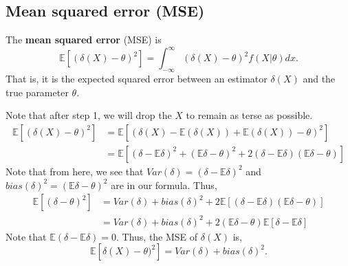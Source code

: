 \documentclass[titlepage, 12pt, leqno]{article}
\begin{document}
\subsection{Mean squared error (MSE)}
\begin{definition}
    The \textbf{mean squared error} (MSE) is
    \[
        \mathbb{E}[(\delta(X) - \theta)^{2}] = \int_{-\infty}^{\infty}
        (\delta(X) - \theta)^{2}f(X|\theta)dx.
    \]
    That is, it is the expected squared error between an estimator $\delta(X)$ 
    and the true parameter $\theta$.
\end{definition}
Note that after step 1, we will drop the $X$ to remain as terse as possible.
\begin{align*}
    \mathbb{E}[(\delta(X) - \theta)^{2}] &= \mathbb{E}[(\delta(X) - 
    \mathbb{E}(\delta(X)) + \mathbb{E}(\delta(X)) - \theta)^{2}] \\
                         &= \mathbb{E}[(\delta - \mathbb{E}\delta)^{2} + 
                         (\mathbb{E}\delta - \theta)^{2} + 2(\delta - 
                         \mathbb{E}\delta)(\mathbb{E}\delta-\theta)]
\end{align*}
Note that from here, we see that $Var(\delta) = (\delta - \mathbb{E}\delta)^{2}$
and $bias(\delta)^{2} = (\mathbb{E}\delta - \theta)^{2}$ are in our formula.
Thus,
\begin{align*}
    \mathbb{E}[(\delta - \theta)^{2}] &= Var(\delta) + bias(\delta)^{2} + 
    2\mathbb{E}[(\delta - \mathbb{E}\delta)(\mathbb{E}\delta-\theta)] \\
                                      &= Var(\delta) + bias(\delta)^{2} + 
                                      2(\mathbb{E}\delta-
                                      \theta)\mathbb{E}[\delta - 
                                      \mathbb{E}\delta]
\end{align*}
Note that $\mathbb{E}(\delta - \mathbb{E}\delta) = 0$. Thus, the MSE of 
 $\delta(X)$ is,
\[
\boxed{\mathbb{E}[\delta(X) - \theta)^{2}] = Var(\delta) + bias(\delta)^{2}}. 
\]
\end{document}
